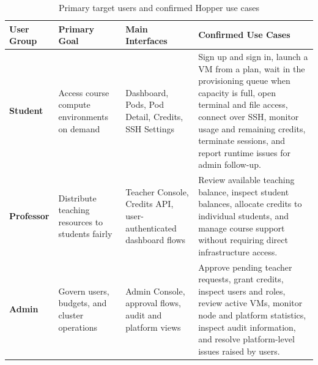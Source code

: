 \documentclass[12pt,a4paper]{article}
\begin{document}
\renewcommand{\arraystretch}{1.3}
\small
\begin{table}[!htbp]
\centering
\caption{Primary target users and confirmed Hopper use cases}
\label{tab:target-users-use-cases}
\begin{tabularx}{\textwidth}{|>{\RaggedRight\arraybackslash\bfseries}p{}|>{\RaggedRight\arraybackslash}p{}|>{\RaggedRight\arraybackslash}p{}|>{\RaggedRight\arraybackslash}X|}
\hline
\textbf{User Group} & \textbf{Primary Goal} & \textbf{Main Interfaces} & \textbf{Confirmed Use Cases} \\
\hline
Student & Access course compute environments on demand & Dashboard, Pods, Pod Detail, Credits, SSH Settings & Sign up and sign in, launch a VM from a plan, wait in the provisioning queue when capacity is full, open terminal and file access, connect over SSH, monitor usage and remaining credits, terminate sessions, and report runtime issues for admin follow-up. \\
\hline
Professor & Distribute teaching resources to students fairly & Teacher Console, Credits API, user-authenticated dashboard flows & Review available teaching balance, inspect student balances, allocate credits to individual students, and manage course support without requiring direct infrastructure access. \\
\hline
Admin & Govern users, budgets, and cluster operations & Admin Console, approval flows, audit and platform views & Approve pending teacher requests, grant credits, inspect users and roles, review active VMs, monitor node and platform statistics, inspect audit information, and resolve platform-level issues raised by users. \\
\hline
\end{tabularx}
\end{table}
\normalsize
\end{document}
